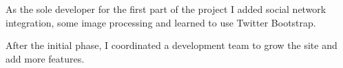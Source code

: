 \documentclass[]{friggeri-cv} %
\begin{document}
\begin{entrylist}
{As the sole developer for the first part of the project I added social network integration, some image processing and learned to use Twitter Bootstrap.

After the initial phase, I coordinated a development team to grow the site and add more features.}
\end{entrylist}


% 

\end{document}

